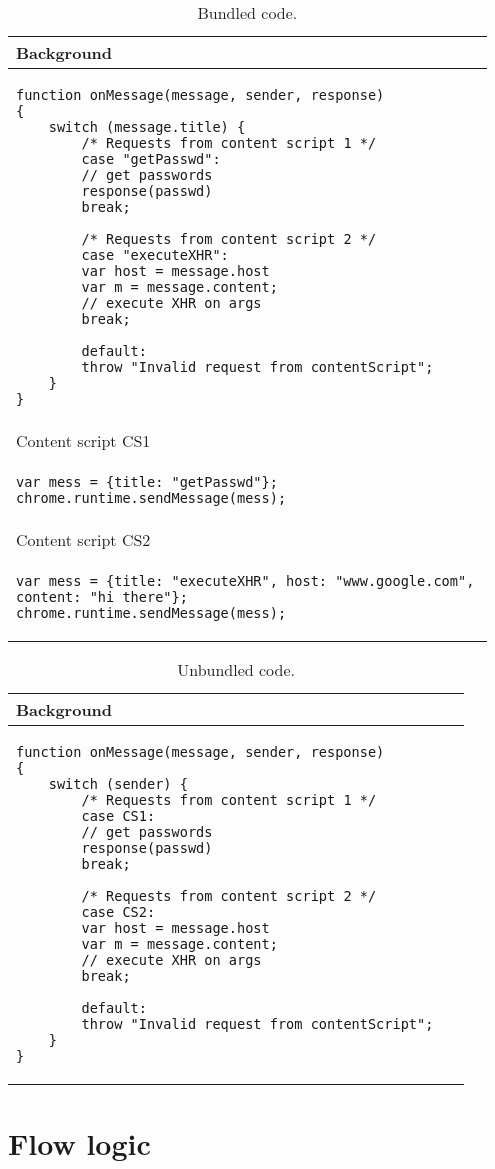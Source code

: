 \begin{table}[tlb]
\begin{small}
\begin{center}
\begin{tabular}{p{0.95\linewidth}}
Background\\
\hline
\begin{lstlisting}
function onMessage(message, sender, response)
{    	
	switch (message.title) {
		/* Requests from content script 1 */
		case "getPasswd":
		// get passwords
		response(passwd)
		break;
		
		/* Requests from content script 2 */
		case "executeXHR":
		var host = message.host
		var m = message.content;
		// execute XHR on args
		break;
				
		default:
		throw "Invalid request from contentScript";
	}
}
\end{lstlisting}\\
\hline
\hline
Content script CS1 \\
\hline
\begin{lstlisting}
var mess = {title: "getPasswd"};
chrome.runtime.sendMessage(mess);
\end{lstlisting}\\
\hline
\hline
Content script CS2\\
\hline
\begin{lstlisting}
var mess = {title: "executeXHR", host: "www.google.com", content: "hi there"};
chrome.runtime.sendMessage(mess);
\end{lstlisting}\\
\end{tabular}
\end{center}
\end{small}
\caption{Bundled code.}
\label{tab:Bundled}
\end{table}
\begin{table}[tlb]
\begin{small}
\begin{center}
\begin{tabular}{p{0.95\linewidth}}
Background\\
\hline
\begin{lstlisting}
function onMessage(message, sender, response)
{    	
	switch (sender) {
		/* Requests from content script 1 */
		case CS1:
		// get passwords
		response(passwd)
		break;
		
		/* Requests from content script 2 */
		case CS2:
		var host = message.host
		var m = message.content;
		// execute XHR on args
		break;
				
		default:
		throw "Invalid request from contentScript";
	}
}
\end{lstlisting}\\
\hline
\end{tabular}
\end{center}
\end{small}
\caption{Unbundled code.}
\label{tab:UnBundled}
\end{table}

\section{Flow logic}
\label{sec:FlowLogic}


